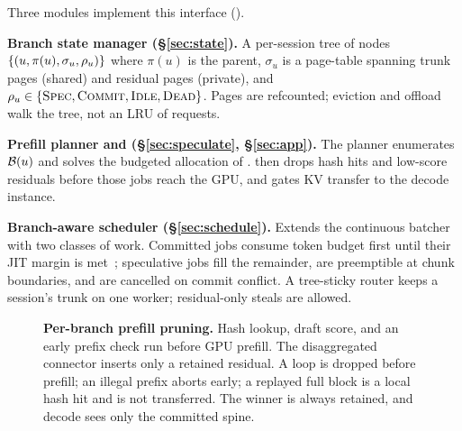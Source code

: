 Three modules implement this interface ().

\smallskip\noindent\textbf{Branch state manager (\S\ref{sec:state}).}
A per-session tree of nodes $\left\{(u, \pi(u), \sigma_u, \rho_u)\right\}$ where $\pi(u)$ is the parent, $\sigma_u$ is a page-table spanning trunk pages (shared) and residual pages (private), and $\rho_u\in\{\textsc{Spec},\textsc{Commit},\textsc{Idle},\textsc{Dead}\}$.
Pages are refcounted; eviction and offload walk the tree, not an LRU of requests.

\smallskip\noindent\textbf{Prefill planner and \app{} (\S\ref{sec:speculate}, \S\ref{sec:app}).}
The planner enumerates $\mathcal{B}(u)$ and solves the budgeted allocation of .
\app then drops hash hits and low-score residuals before those jobs reach the GPU, and gates KV transfer to the decode instance.

\smallskip\noindent\textbf{Branch-aware scheduler (\S\ref{sec:schedule}).}
Extends the continuous batcher with two classes of work.
Committed jobs consume token budget first until their JIT margin is met~\cite{jitserve}; speculative jobs fill the remainder, are preemptible at chunk boundaries, and are cancelled on commit conflict.
A tree-sticky router keeps a session's trunk on one worker; residual-only steals are allowed.

\begin{figure}[t]
\centering
\resizebox{\textwidth}{!}{}
\caption{\textbf{Per-branch prefill pruning.}
Hash lookup, draft score, and an early prefix check run before GPU prefill.
The disaggregated connector inserts only a retained residual.
A loop is dropped before prefill; an illegal prefix aborts early; a replayed full block is a local hash hit and is not transferred.
The winner is always retained, and decode sees only the committed spine.
}
\label{fig:app}
\end{figure}


